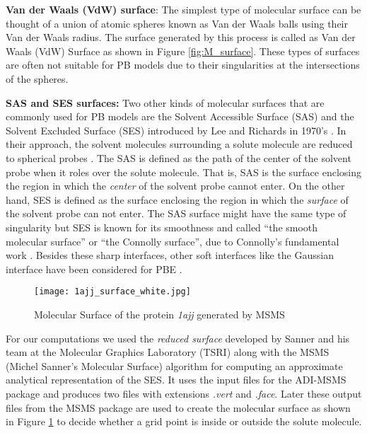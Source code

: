 {\bf Van der Waals (VdW) surface}: The simplest type of molecular surface can be thought of a union of atomic spheres known as Van der Waals balls using their Van der Waals radius. The surface generated by this process is called as Van der Waals (VdW) Surface as shown in Figure \ref{fig:M_surface}. These types of surfaces are often not suitable for PB models due to their singularities at the intersections of the spheres.  

{\bf SAS and SES surfaces:} Two other kinds of molecular surfaces that are commonly used for PB models are the Solvent Accessible Surface (SAS) and the Solvent Excluded Surface (SES) introduced by Lee and Richards in 1970's \cite{LEE1971379,Fred1977}. In their approach, the solvent molecules surrounding a solute molecule are reduced to spherical probes \cite{Tomasi2005}. The SAS is defined as the path of the center of the solvent probe when it roles over the solute molecule. That is, SAS is the surface enclosing the region in which the {\it center} of the solvent probe cannot enter. On the other hand, SES is defined as the surface enclosing the region in which the {\it surface} of the solvent probe can not enter. The SAS surface might have the same type of singularity but SES is known for its smoothness and called “the smooth molecular surface” or “the Connolly surface”, due to Connolly’s fundamental work \cite{Connolly1983}. Besides these sharp interfaces, other soft interfaces like the Gaussian interface have been considered for PBE \cite{Hazra2019}.   
\begin{figure}[!t]
	\centering
	\texttt{[image: 1ajj\_surface\_white.jpg]}	
	\caption{Molecular Surface of the protein \textit{1ajj} generated by MSMS}
	\label{fig:1ajj_surface}
\end{figure}

For our computations we used the {\it reduced surface} developed by Sanner and his team  \cite{MSMS} at the Molecular Graphics Laboratory (TSRI) along with the MSMS (Michel Sanner’s Molecular Surface) algorithm for computing an approximate analytical representation of the SES. It uses the input files for the ADI-MSMS package and produces two files with extensions {\it .vert} and {\it .face}. Later these output files from the MSMS package are used to create the molecular surface as shown in Figure \ref{fig:1ajj_surface} to decide whether a grid point is inside or outside the solute molecule. 


